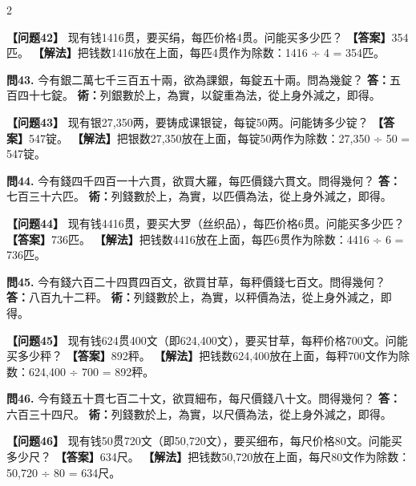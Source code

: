 \documentclass[11pt,a4paper]{article}
\begin{document}
\begin{paracol}{2}
\switchcolumn

\textbf{【问题42】} 现有钱1416贯，要买绢，每匹价格4贯。问能买多少匹？\break
\textbf{【答案】}354匹。\break
\textbf{【解法】}把钱数1416放在上面，每匹4贯作为除数：1416 ÷ 4 = 354匹。

\switchcolumn*

\textbf{問43.} 今有銀二萬七千三百五十兩，欲為課銀，每錠五十兩。問為幾錠？\break
\textbf{答：}五百四十七錠。\break
\textbf{術：}列銀數於上，為實，以錠重為法，從上身外減之，即得。

\switchcolumn

\textbf{【问题43】} 现有银27,350两，要铸成课银锭，每锭50两。问能铸多少锭？\break
\textbf{【答案】}547锭。\break
\textbf{【解法】}把银数27,350放在上面，每锭50两作为除数：27,350 ÷ 50 = 547锭。

\switchcolumn*

\textbf{問44.} 今有錢四千四百一十六貫，欲買大羅，每匹價錢六貫文。問得幾何？\break
\textbf{答：}七百三十六匹。\break
\textbf{術：}列錢數於上，為實，以匹價為法，從上身外減之，即得。

\switchcolumn

\textbf{【问题44】} 现有钱4416贯，要买大罗（丝织品），每匹价格6贯。问能买多少匹？\break
\textbf{【答案】}736匹。\break
\textbf{【解法】}把钱数4416放在上面，每匹6贯作为除数：4416 ÷ 6 = 736匹。

\switchcolumn*

\textbf{問45.} 今有錢六百二十四貫四百文，欲買甘草，每秤價錢七百文。問得幾何？\break
\textbf{答：}八百九十二秤。\break
\textbf{術：}列錢數於上，為實，以秤價為法，從上身外減之，即得。

\switchcolumn

\textbf{【问题45】} 现有钱624贯400文（即624,400文），要买甘草，每秤价格700文。问能买多少秤？\break
\textbf{【答案】}892秤。\break
\textbf{【解法】}把钱数624,400放在上面，每秤700文作为除数：624,400 ÷ 700 = 892秤。

\switchcolumn*

\textbf{問46.} 今有錢五十貫七百二十文，欲買細布，每尺價錢八十文。問得幾何？\break
\textbf{答：}六百三十四尺。\break
\textbf{術：}列錢數於上，為實，以尺價為法，從上身外減之，即得。

\switchcolumn

\textbf{【问题46】} 现有钱50贯720文（即50,720文），要买细布，每尺价格80文。问能买多少尺？\break
\textbf{【答案】}634尺。\break
\textbf{【解法】}把钱数50,720放在上面，每尺80文作为除数：50,720 ÷ 80 = 634尺。

\switchcolumn*


\end{paracol}
\end{document}

